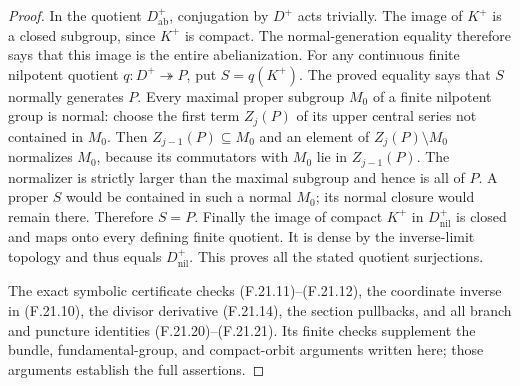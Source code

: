 \begin{proof}
In the quotient $D^+_{\mathrm{ab}}$, conjugation
by $D^+$ acts trivially. The image of $K^+$ is
a closed subgroup, since $K^+$ is compact.
The normal-generation equality therefore says
that this image is the entire abelianization.
For any continuous finite nilpotent quotient
$q:D^+\twoheadrightarrow P$, put $S=q(K^+)$.
The proved equality says that $S$ normally
generates $P$. Every maximal proper subgroup
$M_0$ of a finite nilpotent group is normal:
choose the first term $Z_j(P)$ of its upper
central series not contained in $M_0$.
Then $Z_{j-1}(P)\subseteq M_0$ and an element
of $Z_j(P)\setminus M_0$ normalizes $M_0$,
because its commutators with $M_0$ lie in
$Z_{j-1}(P)$. The normalizer is strictly
larger than the maximal subgroup and hence
is all of $P$. A proper $S$ would be contained
in such a normal $M_0$; its normal closure
would remain there. Therefore $S=P$.
Finally the image of compact $K^+$ in
$D^+_{\mathrm{nil}}$ is closed and maps onto
every defining finite quotient. It is dense
by the inverse-limit topology and thus equals
$D^+_{\mathrm{nil}}$. This proves all the
stated quotient surjections.

The exact symbolic certificate
checks (F.21.11)--(F.21.12), the coordinate
inverse in (F.21.10), the divisor derivative
(F.21.14), the section pullbacks, and all branch
and puncture identities (F.21.20)--(F.21.21).
Its finite checks supplement the bundle,
fundamental-group, and compact-orbit arguments
written here; those arguments establish the
full assertions.
\end{proof}
